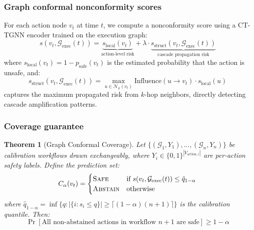 \documentclass[preprint,review,12pt]{elsarticle}
\newtheorem{theorem}{Theorem}
\newcommand{\calG}{\mathcal{G}}
\newcommand{\calN}{\mathcal{N}}
\begin{document}
\subsubsection{Graph conformal nonconformity scores}
For each action node $v_t$ at time $t$, we compute a nonconformity score using a CT-TGNN encoder trained on the execution graph:
\begin{equation}\label{eq:nonconformity}
    s(v_t, \calG_{\text{exec}}(t)) = \underbrace{s_{\text{local}}(v_t)}_{\text{action-level risk}} + \lambda \cdot \underbrace{s_{\text{struct}}(v_t, \calG_{\text{exec}}(t))}_{\text{cascade propagation risk}}
\end{equation}
where $s_{\text{local}}(v_t) = 1 - p_{\text{safe}}(v_t)$ is the estimated probability that the action is unsafe, and:
\begin{equation}
    s_{\text{struct}}(v_t, \calG_{\text{exec}}(t)) = \max_{u \in \calN_k(v_t)} \text{Influence}(u \to v_t) \cdot s_{\text{local}}(u)
\end{equation}
captures the maximum propagated risk from $k$-hop neighbors, directly detecting cascade amplification patterns.

\subsubsection{Coverage guarantee}

\begin{theorem}[Graph Conformal Coverage]\label{thm:coverage}
Let $\{(\calG_1, Y_1), \ldots, (\calG_n, Y_n)\}$ be calibration workflows drawn exchangeably, where $Y_i \in \{0,1\}^{|V_{\text{action},i}|}$ are per-action safety labels. Define the prediction set:
\begin{equation}
    C_\alpha(v_t) = \begin{cases}
        \textsc{Safe} & \text{if } s(v_t, \calG_{\text{exec}}(t)) \leq \hat{q}_{1-\alpha} \\
        \textsc{Abstain} & \text{otherwise}
    \end{cases}
\end{equation}
where $\hat{q}_{1-\alpha} = \inf\{q : |\{i : s_i \leq q\}| \geq \lceil(1{-}\alpha)(n{+}1)\rceil\}$ is the calibration quantile. Then:
\begin{equation}
    \Pr\!\left[\text{All non-abstained actions in workflow } n{+}1 \text{ are safe}\right] \geq 1 - \alpha
\end{equation}
\end{theorem}
\end{document}
